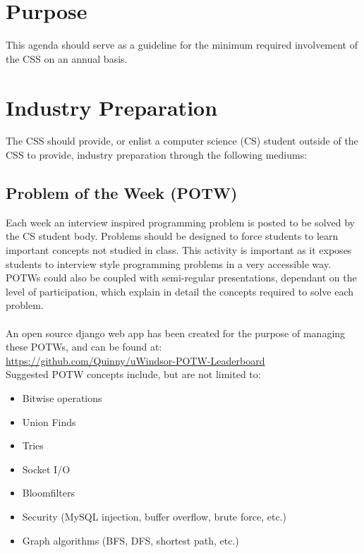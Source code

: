 \documentclass[12pt]{article}
\begin{document}
\maketitle

\tableofcontents

\pagebreak

\section{Purpose}
This agenda should serve as a guideline for the minimum required involvement of
the CSS on an annual basis.

\section{Industry Preparation}
The CSS should provide, or enlist a computer science (CS) student outside of the CSS
to provide, industry preparation through the following mediums:

\subsection{Problem of the Week (POTW)}
Each week an interview inspired programming problem is posted to be solved by the
CS student body.  Problems should be designed to force students to learn important
concepts not studied in class.  This activity is important as it exposes students
to interview style programming problems in a very accessible way.  POTWs could
also be coupled with semi-regular presentations, dependant on the level of
participation, which explain in detail the concepts required to solve each problem.
\\ \\
An open source django web app has been created for the purpose of managing these POTWs,
and can be found at: \\
\url{https://github.com/Quinny/uWindsor-POTW-Leaderboard}
\\
Suggested POTW concepts include, but are not limited to:
\begin{itemize}
  \item Bitwise operations
  \item Union Finds
  \item Tries
  \item Socket I/O
  \item Bloomfilters
  \item Security (MySQL injection, buffer overflow, brute force, etc.)
  \item Graph algorithms (BFS, DFS, shortest path, etc.)
\end{itemize}
\end{document}
